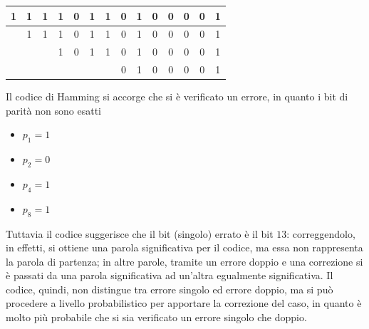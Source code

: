 \documentclass[a4paper]{extarticle}
\renewcommand\arraystretch{}
\begin{document}
\noindent
\begin{table}[H]
\setlength{\tabcolsep}{4pt}
\renewcommand{\arraystretch}{1.2}
\centering
\begin{tabular}{|c|c|c|c|c|c|c|c|c|c|c|c|c|c|}
    \hline
    \cellcolor{orange!75!white}1 & 1 & \cellcolor{orange!25!white}1 & 1 & \cellcolor{orange!25!white}0 & 1 & \cellcolor{orange!25!white}1 & 0 & \cellcolor{orange!25!white}1 & 0 & \cellcolor{orange!25!white}0 & 0 & \cellcolor{orange!25!white}0 & 1\\
    \hline
     & \cellcolor{orange!75!white}1 & \cellcolor{orange!25!white}1 & 1 & 0 & \cellcolor{orange!25!white}1 & \cellcolor{orange!25!white}1 & 0 & 1 & \cellcolor{orange!25!white}0 & \cellcolor{orange!25!white}0 & 0 & 0 & \cellcolor{orange!25!white}1\\
    \hline
     &  &  & \cellcolor{orange!75!white}1 & \cellcolor{orange!25!white}0 & \cellcolor{orange!25!white}1 & \cellcolor{orange!25!white}1 & 0 & 1 & 0 & 0 & \cellcolor{orange!25!white}0 & \cellcolor{orange!25!white}0 & \cellcolor{orange!25!white}1\\
    \hline
     &  &  &  &  &  &  & \cellcolor{orange!75!white}0 & \cellcolor{orange!25!white}1 & \cellcolor{orange!25!white}0 & \cellcolor{orange!25!white}0 & \cellcolor{orange!25!white}0 & \cellcolor{orange!25!white}0 & \cellcolor{orange!25!white}1\\
    \hline
\end{tabular}
\end{table}

\vspace{1em}
\noindent
Il codice di Hamming si accorge che si è verificato un errore, in quanto i bit di parità non sono esatti
\begin{itemize}
    \item $p_1=1$
    \item $p_2=0$
    \item $p_4=1$
    \item $p_8=1$
\end{itemize}
Tuttavia il codice suggerisce che il bit (singolo) errato è il bit $13$: correggendolo, in effetti, si ottiene una parola significativa per il codice, ma essa non rappresenta la parola di partenza; in altre parole, tramite un errore doppio e una correzione si è passati da una parola significativa ad un'altra egualmente significativa. Il codice, quindi, non distingue tra errore singolo ed errore doppio, ma si può procedere a livello probabilistico per apportare la correzione del caso, in quanto è molto più probabile che si sia verificato un errore singolo che doppio.
\end{document}
